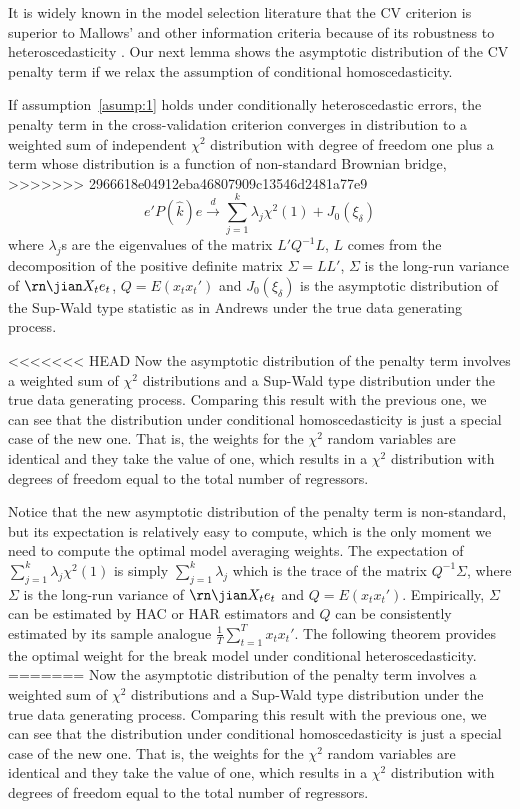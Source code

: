 \begin{lemma}
It is widely known in the model selection literature that the CV criterion is superior to Mallows' and other information criteria because of its robustness to heteroscedasticity \cite{andrews_JE1991}. Our next lemma shows the asymptotic distribution of the CV penalty term if we relax the assumption of conditional homoscedasticity.
\begin{lemma} \label{thm:2}
If assumption~\ref{asump:1} holds under conditionally heteroscedastic errors, the penalty term in the cross-validation criterion converges in distribution to a weighted sum of independent $\chi^2$ distribution with degree of freedom one plus a term whose distribution is a function of non-standard Brownian bridge,
>>>>>>> 2966618e04912eba46807909c13546d2481a77e9
\begin{equation} \label{eq:4}
	e'P(\hat{k})e \stackrel{d}{\rightarrow} \sum_{j=1}^{k} \lambda_j \chi^2(1) + J_0(\xi_{\delta})
\end{equation}
where $\lambda_j$s are the eigenvalues of the matrix $L'Q^{-1}L$, $L$ comes from the decomposition of the positive definite matrix $\Sigma = LL'$, $\Sigma$ is the long-run variance of $\rn\jian X_t e_t$, $Q = E(x_t x_t')$ and $J_0(\xi_{\delta})$ is the asymptotic distribution of the Sup-Wald type statistic as in Andrews \cite{andrews93} under the true data generating process.
\end{lemma}
<<<<<<< HEAD
Now the asymptotic distribution of the penalty term involves a weighted sum of $\chi^2$ distributions and a Sup-Wald type distribution under the true data generating process. Comparing this result with the previous one, we can see that the distribution under conditional homoscedasticity is just a special case of the new one. That is, the weights for the $\chi^2$ random variables are identical and they take the value of one, which results in a $\chi^2$ distribution with degrees of freedom equal to the total number of regressors.

Notice that the new asymptotic distribution of the penalty term is non-standard, but its expectation is relatively easy to compute, which is the only moment we need to compute the optimal model averaging weights. The expectation of $\sum_{j=1}^{k} \lambda_j \chi^2(1)$ is simply $\sum_{j=1}^{k} \lambda_j$ which is the trace of the matrix $Q^{-1} \Sigma$, where $\Sigma$ is the long-run variance of $\rn\jian X_t e_t$ and $Q = E(x_t x_t')$. Empirically, $\Sigma$ can be estimated by HAC or HAR estimators and $Q$ can be consistently estimated by its sample analogue $\frac{1}{T}\sum_{t=1}^{T}x_t x_t'$. The following theorem provides the optimal weight for the break model under conditional heteroscedasticity.
=======
Now the asymptotic distribution of the penalty term involves a weighted sum of $\chi^2$ distributions and a Sup-Wald type distribution under the true data generating process. Comparing this result with the previous one, we can see that the distribution under conditional homoscedasticity is just a special case of the new one. That is, the weights for the $\chi^2$ random variables are identical and they take the value of one, which results in a $\chi^2$ distribution with degrees of freedom equal to the total number of regressors. 


\end{lemma}
